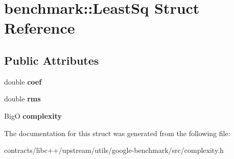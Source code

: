 \hypertarget{structbenchmark_1_1_least_sq}{}\section{benchmark\+:\+:Least\+Sq Struct Reference}
\label{structbenchmark_1_1_least_sq}
\subsection*{Public Attributes}
\begin{DoxyCompactItemize}
\item 
\mbox{\label{structbenchmark_1_1_least_sq_a9846323ca8df3f0516039d2fa4e4d9ae}} 
double {\bfseries coef}
\item 
\mbox{\label{structbenchmark_1_1_least_sq_a1894a7cae5859eac940c52059f3eda6e}} 
double {\bfseries rms}
\item 
\mbox{\label{structbenchmark_1_1_least_sq_ac1af3df1a281828c77321e2d40a52ea5}} 
BigO {\bfseries complexity}
\end{DoxyCompactItemize}


The documentation for this struct was generated from the following file\+:\begin{DoxyCompactItemize}
\item 
contracts/libc++/upstream/utils/google-\/benchmark/src/complexity.\+h\end{DoxyCompactItemize}
